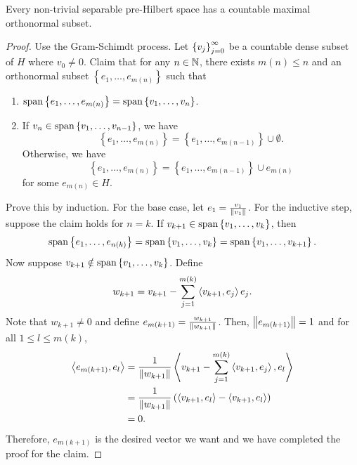 \documentclass[a4paper]{article}
\begin{document}
\begin{thm}
  Every non-trivial separable pre-Hilbert space 
  has a countable maximal orthonormal subset.
\end{thm}

\begin{proof}
Use the Gram-Schimdt process.
Let $\left\{ v_j \right\}_{j=0}^\infty$ be a countable dense subset of $H$
where $v_0 \neq 0$. Claim that for any $n \in \mathbb{N}$, 
there exists $m(n) \leq n$ and an orthonormal subset 
$\left\{ e_1, \dots, e_{m(n)} \right\}$ such that 
\begin{enumerate}
  \item $\operatorname{span} \left\{ e_1, \dots, e_{m(n)} \right\} 
   = \operatorname{span} \left\{ v_1, \dots, v_n \right\}$.
  
  \item 
  If $v_n \in \operatorname{span} \left\{ v_1, \dots, v_{n-1} 
  \right\}$, we have 
  \[
    \left\{ e_1, \dots, e_{m(n)} \right\}  
    = \left\{ e_1, \dots, e_{m(n-1)} \right\} \cup 
    \emptyset.
  \]
  Otherwise, we have
  \[
    \left\{ e_1, \dots, e_{m(n)} \right\}  
    = \left\{ e_1, \dots, e_{m(n-1)} \right\} \cup 
    e_{m(n)}
  \]
  for some $e_{m(n)} \in H$.
\end{enumerate}
Prove this by induction. For the base case, 
let $e_1 = \frac{v_1}{\left\lVert v_1\right\rVert}$. 
For the inductive step, suppose the claim holds for 
$n = k$. If $v_{k+1} \in \operatorname{span} \left\{ v_1, \dots, v_k \right\}$,
then 
\[
\operatorname{span} \left\{ e_1, \dots, e_{n(k)} \right\}
= \operatorname{span} \left\{ v_1, \dots, v_k \right\} 
= \operatorname{span} \left\{ v_1, \dots, v_{k+1} \right\}.
\]
Now suppose $v_{k+1} \notin \operatorname{span} \left\{ v_1, \dots, v_k \right\}$.
Define 
\[
w_{k+1} = v_{k+1} - \sum_{j=1}^{m(k)} \left\langle v_{k+1}, e_j \right\rangle e_j.
\]
Note that $w_{k+1} \neq 0$ and define $e_{m(k+1)} = 
\frac{w_{k+1}}{\left\lVert w_{k+1}\right\rVert}$. Then, $\left\lVert e_{m(k+1)}\right\rVert = 1$
and for all $1 \leq l \leq m(k)$, 
\[
\begin{aligned}
  \left\langle e_{m(k+1)}, e_l \right\rangle 
  &= \frac{1}{\left\lVert w_{k+1}\right\rVert}
  \left\langle v_{k+1} - \sum_{j=1}^{m(k)} \left\langle v_{k+1}, e_j \right\rangle, e_l \right\rangle \\
  &= \frac{1}{\left\lVert w_{k+1}\right\rVert} 
  \left( \left\langle v_{k+1}, e_l \right\rangle - \left\langle v_{k+1}, e_l \right\rangle \right) \\
  &= 0.
\end{aligned}
\]
Therefore, $e_{m(k+1)}$ is the desired vector we want and 
we have completed the proof for the claim.


\end{proof}
\end{document}

